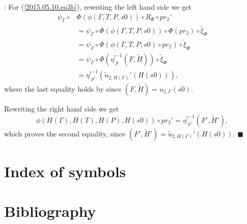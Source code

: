 \documentclass[12pt]{article}
\numberwithin{equation}{section}
\newenvironment{myproof}{{\bf Proof}:}{$\blacksquare$ \vskip 5mm }
\newcommand{\wt}{\widetilde}
\newcommand{\etashriek}{\eta^!}
\newcommand{\etaunshriek}{{\etashriek}^{-1}}
\begin{document}
\begin{myproof}
For (\ref{2015.05.10.eq3b}), rewriting the left hand side we get
%
\begin{align*}
  \psi_{\Gamma}\circ & \Phi(\phi(\Gamma,T,P,s0))\circ R_{\Phi}\circ pr_2'  \\
    & = \psi_{\Gamma}\circ \Phi(\phi(\Gamma,T,P,s0))\circ \Phi(pr_2)\circ \wt{\xi}_{\Phi} \\
    & = \psi_{\Gamma}\circ \Phi(\phi(\Gamma,T,P,s0)\circ pr_2)\circ \wt{\xi}_{\Phi} \\
    & = \psi_{\Gamma}\circ \Phi(\etaunshriek_p(F,\wt{H}))\circ \wt{\xi}_{\Phi} \\
    & = \etaunshriek_{p'}(\wt{u}_{2,H(\Gamma)}'(H(s0))),
\end{align*}
%
where the last equality holds by \cite[Lemma 6.2(2)]{fromunivwithPi} since
$(F,\wt{H})=u_{2,\Gamma}(s0)$.

Rewriting the right hand side we get
%
$$\phi(H(\Gamma),H(T),H(P),H(s0))\circ pr_2'=\etaunshriek_{p'}(F',\wt{H}'),$$
%
which proves the second equality, since
$(F',\wt{H}')=\wt{u}_{2,H(\Gamma)}'(H(s0))$.
\end{myproof}

\section{Index of symbols}
\printglossaries

\section{Bibliography}


\end{document}
